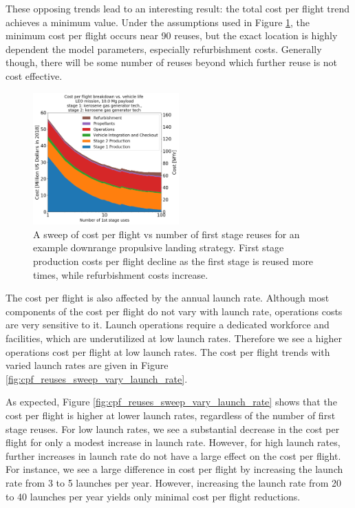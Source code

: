 \documentclass{iaf-iac}
\begin{document}
\begin{multicols}{2}
These opposing trends lead to an interesting result: the total cost per flight trend achieves a minimum value. Under the assumptions used in Figure \ref{fig:cpf_stackplot_reuses_sweep}, the minimum cost per flight occurs near 90 reuses, but the exact location is highly dependent the model parameters, especially refurbishment costs. Generally though, there will be some number of reuses beyond which further reuse is not cost effective.


\begin{figure}[H]
    \centering
    \includegraphics[width=0.5\textwidth]{../../lvreuse/analysis/combined/plots/cpf_stackplot_reuses_sweep}
    \caption{\label{fig:cpf_stackplot_reuses_sweep} A sweep of cost per flight vs number of first stage reuses for an example downrange propulsive landing strategy. First stage production costs per flight decline as the first stage is reused more times, while refurbishment costs increase.}
\end{figure}

The cost per flight is also affected by the annual launch rate. Although most components of the cost per flight do not vary with launch rate, operations costs are very sensitive to it. Launch operations require a dedicated workforce and facilities, which are underutilized at low launch rates. Therefore we see a higher operations cost per flight at low launch rates. The cost per flight trends with varied launch rates are given in Figure \ref{fig:cpf_reuses_sweep_vary_launch_rate}. 



As expected, Figure \ref{fig:cpf_reuses_sweep_vary_launch_rate} shows that the cost per flight is higher at lower launch rates, regardless of the number of first stage reuses. For low launch rates, we see a substantial decrease in the cost per flight for only a modest increase in launch rate. However, for high launch rates, further increases in launch rate do not have a large effect on the cost per flight. For instance, we see a large difference in cost per flight by increasing the launch rate from 3 to 5 launches per year. However, increasing the launch rate from 20 to 40 launches per year yields only minimal cost per flight reductions. 



\end{multicols}
\end{document}
